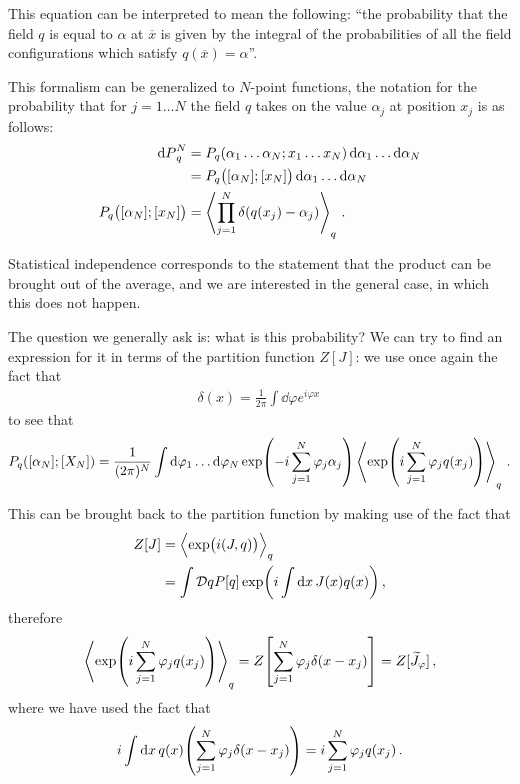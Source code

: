 \documentclass[main.tex]{subfiles}
\begin{document}
This equation can be interpreted to mean the following: ``the probability that the field \(q\) is equal to \(\alpha \) at \(\overline{x}\) is given by the integral of the probabilities of all the field configurations which satisfy \(q(\overline{x}) = \alpha \)''.

This formalism can be generalized to \(N\)-point functions, the notation for the probability that for \(j = 1 \dots N\) the field \(q\) takes on the value \(\alpha _j\) at position \(x_j\) is as follows: 
%
\begin{align}
\dd{P}_q^{N} &= P_q \qty(\alpha_1 \dots \alpha _N; x_1 \dots x_N) \dd{\alpha_1 } \dots \dd{\alpha _N}  \\
&= P_q \qty([\alpha _N]; [x_N]) \dd{\alpha_1 } \dots \dd{\alpha _N}  \\
P_q \qty([\alpha _N]; [x_N]) 
&= \expval{\prod_{j=1}^{N} \delta (q(x_j) - \alpha _j)}_q
\,.
\end{align}

Statistical independence corresponds to the statement that the product can be brought out of the average, and we are interested in the general case, in which this does not happen.

The question we generally ask is: what is this probability? We can try to find an expression for it in terms of the partition function \(Z[J]\): we use once again the fact that 
%
\begin{align}
\delta (x) = \frac{1}{2 \pi } \int \dd{\varphi } e^{i \varphi x}
\,
\end{align}
%
to see that 
%
\begin{align}
P_q ([\alpha _N]; [X_N]) = \frac{1}{(2 \pi )^{N}} \int \dd{\varphi_1 } \dots \dd{\varphi _N} \exp(- i \sum _{j=1}^{N} \varphi _j \alpha _j)
\expval{\exp(i \sum _{j=1}^{N}\varphi _j q(x_j))}_q
\,.
\end{align}

This can be brought back to the partition function by making use of the fact that 
%
\begin{align}
Z[J] &= \expval{\exp(i (J, q))}_q  \\
&= \int \mathcal{D}q P[q] \exp( i \int \dd{x} J(x) q(x))
\,,
\end{align}
%
therefore 
%
\begin{align}
\expval{\exp(i \sum _{j=1}^{N}\varphi _j q(x_j))}_q
= Z \qty[ \sum _{j=1}^{N} \varphi _j \delta (x - x_j)] 
= Z[ \widetilde{J}_\varphi ]
\,,
\end{align}
%
where we have used the fact that 
%
\begin{align}
i \int \dd{x} q(x) \qty(\sum _{j=1}^{N} \varphi _j \delta (x-x_j))
= i \sum _{j=1}^{N} \varphi_j q(x_j) 
\,.
\end{align}
\end{document}

